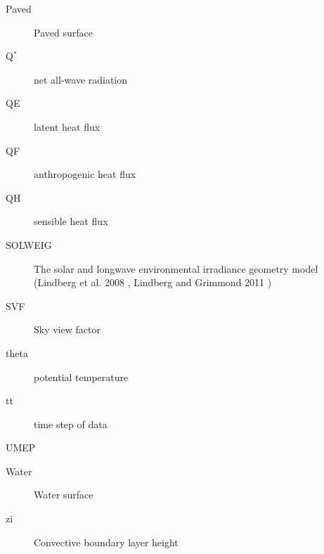 \documentclass[letterpaper,10pt,english]{sphinxmanual}
\begin{document}
\begin{description}
\item[{Paved}] \leavevmode{}\label{\detokenize{notation:term-paved}}
Paved surface

\item[{Q$^{\text{*}}$}] \leavevmode{}\label{\detokenize{notation:term-qstar}}
net all-wave radiation

\item[{QE}] \leavevmode{}\label{\detokenize{notation:term-qe}}
latent heat flux

\item[{QF}] \leavevmode{}\label{\detokenize{notation:term-qf}}
anthropogenic  heat flux

\item[{QH}] \leavevmode{}\label{\detokenize{notation:term-qh}}
sensible heat  flux

\item[{SOLWEIG}] \leavevmode{}\label{\detokenize{notation:term-solweig}}
The solar and longwave environmental irradiance geometry model
(Lindberg et al. 2008 \label{\detokenize{notation:id8}}{\hyperref[\detokenize{references:fl2008}]{\sphinxcrossref{{[}FL2008{]}}}},   Lindberg and Grimmond 2011 \label{\detokenize{notation:id9}}{\hyperref[\detokenize{references:fl2011}]{\sphinxcrossref{{[}FL2011{]}}}})

\item[{SVF}] \leavevmode{}\label{\detokenize{notation:term-svf}}
Sky view factor

\item[{theta}] \leavevmode{}\label{\detokenize{notation:term-theta}}
potential  temperature

\item[{tt}] \leavevmode{}\label{\detokenize{notation:term-tt}}
time step of data

\item[{UMEP}] \leavevmode{}\label{\detokenize{notation:term-umep}}

\item[{Water}] \leavevmode{}\label{\detokenize{notation:term-water}}
Water surface

\item[{zi}] \leavevmode{}\label{\detokenize{notation:term-zi}}
Convective boundary layer height

\end{description}
\end{document}
